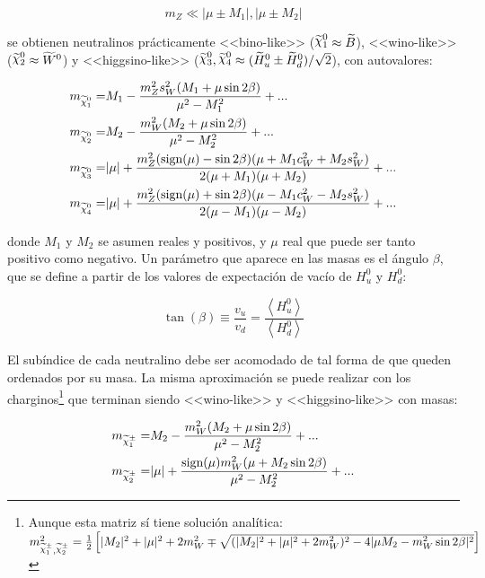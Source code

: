 \begin{equation}
	m_Z \ll |\mu \pm M_1|, |\mu \pm M_2|
\end{equation}

\noindent
se obtienen neutralinos prácticamente <<bino-like>> ($\ninoone \approx \widetilde{B}$), <<wino-like>> ($\ninotwo \approx \widetilde{W}^0$) y <<higgsino-like>> ($\ninothree, \ninofour \approx (\Hinouzero \pm \Hinodzero)/\sqrt{2}$), con autovalores:

\begin{equation}
	\begin{split}
		m_{\ninoone} = & M_1 - \frac{m_Z^2 s_W^2 (M_1 + \mu \sin{2\beta})}{\mu^2 - M_1^2} + ... \\
		m_{\ninotwo} = & M_2 - \frac{m_W^2 (M_2 + \mu \sin{2\beta})}{\mu^2 - M_2^2} + ... \\
		m_{\ninothree} = & |\mu| + \frac{m_Z^2 (\text{sign}(\mu) - \sin{2\beta})(\mu + M_1 c_W^2 + M_2 s_W^2)}{2 (\mu + M_1) (\mu + M_2)} + ... \\
		m_{\ninofour} = & |\mu| + \frac{m_Z^2 (\text{sign}(\mu) + \sin{2\beta})(\mu - M_1 c_W^2 - M_2 s_W^2)}{2 (\mu - M_1) (\mu - M_2)} + ... \\
	\end{split}
	\label{eq:nc_mass}
\end{equation}

\noindent
donde $M_1$ y $M_2$ se asumen reales y positivos, y $\mu$ real que puede ser tanto positivo como negativo. 
Un parámetro que aparece en las masas es el ángulo $\beta$, que se define a partir de los valores de expectación de vacío de $H_u^0$ y $H_d^0$:
	
\begin{equation}
	\tan(\beta) \equiv \frac{v_u}{v_d} = \frac{\left< H_u^0 \right>}{\left< H_d^0 \right>}
\end{equation}

El subíndice de cada neutralino debe ser acomodado de tal forma de que queden ordenados por su masa. La misma aproximación se puede realizar con los charginos\footnote{Aunque esta matriz sí tiene solución analítica: \\ $m_{\chinoonepm, \chinotwopm}^2 = \frac{1}{2} \left[ |M_2|^2 + |\mu|^2 + 2 m_W^2 \mp \sqrt{(|M_2|^2 + |\mu|^2 + 2 m_W^2)^2 - 4 |\mu M_2 - m_W^2 \sin{2\beta}|^2} \right]$} que terminan siendo <<wino-like>> y <<higgsino-like>> con masas:

\begin{equation}
	\begin{split}
		m_{\chinoonepm} = & M_2 - \frac{m_W^2 (M_2 + \mu \sin{2\beta})}{\mu^2 - M_2^2} + ... \\
		m_{\chinotwopm} = & |\mu| + \frac{\text{sign}(\mu) m_W^2 (\mu + M_2 \sin{2\beta})}{\mu^2 - M_2^2} + ... \\
	\end{split}
\end{equation}

